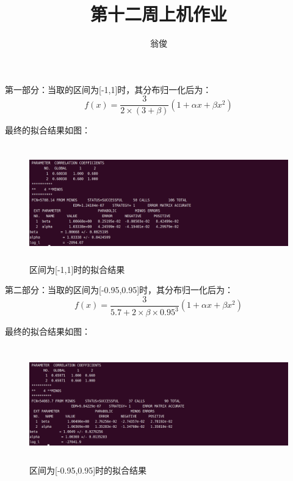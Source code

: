 \documentclass[10pt,a4paper]{article}
\author{翁俊}
\title{第十二周上机作业}
\begin{document}
\maketitle
\newpage
第一部分：当取的区间为[-1,1]时，其分布归一化后为：
\[
f(x)=\frac{3}{2\times (3+\beta)}(1+\alpha x+\beta x^2)
\]

最终的拟合结果如图：
\begin{figure}[ht]
 \centering
 \includegraphics[height=5cm]{img/wj1.png}
 \caption{区间为[-1,1]时的拟合结果}
 \label{fig:singleblock}
\end{figure}

\newpage
第二部分：当取的区间为[-0.95,0.95]时，其分布归一化后为：
\[
f(x)=\frac{3}{5.7+2\times \beta \times 0.95^3}(1+\alpha x+\beta x^2)
\]

最终的拟合结果如图：
\begin{figure}[ht]
 \centering
 \includegraphics[height=5cm]{img/wj2.png}
 \caption{区间为[-0.95,0.95]时的拟合结果}
 \label{fig:singleblock}
\end{figure}
\end{document}
